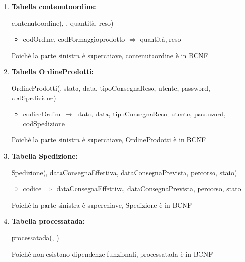 \documentclass[12pt,a4paper]{article}
\begin{document}
\begin{enumerate}
\item[] \textbf{Tabella contenutoordine:}

contenutoordine(\underline{}, \underline{}, quantità, reso)
\begin{itemize}
\vspace{-5pt}
\item codOrdine, codFormaggioprodotto $\Rightarrow$ quantità, reso
\vspace{-5pt}
\end{itemize}
Poichè la parte sinistra è superchiave, contenutoordine è in BCNF
\vspace{10pt}



\item[] \textbf{Tabella OrdineProdotti:}

OrdineProdotti(\underline{}, stato, data, tipoConsegnaReso,  utente,  password,  codSpedizione)
\begin{itemize}
\vspace{-5pt}
\item codiceOrdine $\Rightarrow$ stato, data, tipoConsegnaReso, utente, passsword, codSpedizione
\vspace{-5pt}
\end{itemize}
Poichè la parte sinistra è superchiave, OrdineProdotti è in BCNF
\vspace{10pt}



\item[] \textbf{Tabella Spedizione:}

Spedizione(\underline{}, dataConsegnaEffettiva, dataConsegnaPrevista, percorso, stato)
\begin{itemize}
\vspace{-5pt}
\item codice $\Rightarrow$ dataConsegnaEffettiva, dataConsegnaPrevista, percorso, stato
\vspace{-5pt}
\end{itemize}
Poichè la parte sinistra è superchiave, Spedizione è in BCNF
\vspace{10pt}



\item[] \textbf{Tabella processatada:}

processatada(\underline{}, \underline{})

Poichè non esistono dipendenze funzionali, processatada è in BCNF
\vspace{10pt}




\end{enumerate}
\end{document}

